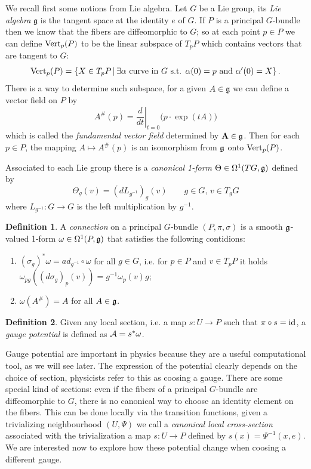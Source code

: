 \documentclass{article}
\theoremstyle{definition}
\newtheorem{defi}{Definition}
\theoremstyle{remark}
\begin{document}
We recall first some notions from Lie algebra. Let \(G\) be a Lie group, its \emph{Lie algebra} \(\mathfrak{g}\) is the tangent space at the identity \(e\) of \(G\). If \(P\) is a principal \(G\)-bundle then we know that the fibers are diffeomorphic to \(G\); so at each point \(p\in P\) we can define \(\operatorname{Vert}_p(P)\) to be the linear subspace of \(T_pP\) which contains vectors that are tangent to \(G\):
\[\operatorname{Vert}_p(P)=\left\{X\in T_pP\, |\, \exists\alpha \text{ curve in \(G\) s.t. } \alpha(0)=p \text{ and } \alpha'(0)=X\right\}.\]
There is a way to determine such subspace, for a given \(A\in\mathfrak{g}\) we can define a vector field on \(P\) by
\[A^\#(p) = \left.\frac{d}{dt}\right|_{t=0} \big( p \cdot \exp(tA) \big)\]
which is called the \emph{fundamental vector field} determined by \(\mathbf{A}\in \mathfrak{g}\). Then for each \(p\in P\), the mapping \(A\mapsto A^\#(p)\) is an isomorphism from \(\mathfrak{g}\) onto \(\operatorname{Vert}_p(P)\).

Associated to each Lie group there is a \emph{canonical 1-form} \(\Theta\in\Omega^1(TG,\mathfrak{g})\) defined by 
\[\Theta_g(v)=(dL_{g^{-1}})_g(v)\qquad g\in G,\, v\in T_gG\]
where \(L_{g^{-1}}\colon G\to G\) is the left multiplication by \(g^{-1}\).

\begin{defi}\label{def: connection on princial bundles}
    A \emph{connection} on a principal \(G\)-bundle \((P,\pi,\sigma)\) is a smooth \(\mathfrak{g}\)-valued 1-form \(\omega\in\Omega^1(P,\mathfrak{g})\) that satisfies the following contidions:
    \begin{enumerate}
        \item \((\sigma_g)^*\omega=ad_{g^{-1}}\circ \omega\) for all \(g\in G\), i.e. for \(p\in P\) and \(v\in T_pP\) it holds \(\omega_{pg}((d\sigma_g)_p(v))=g^{-1}\omega_p(v)g\);
        \item \(\omega(A^\#)=A\) for all \(A\in\mathfrak{g}\).
    \end{enumerate}
\end{defi}

\begin{defi}
    Given any local section, i.e. a map \(s\colon U\to P\) such that \(\pi\circ s=\mathrm{id}\),
    a \emph{gauge potential} is defined as \(\mathcal{A}=s^*\omega\).
\end{defi}

Gauge potential are important in physics because they are a useful computational tool, as we will see later. The expression of the potential clearly depends on the choice of section, physicists refer to this as coosing a gauge. There are some special kind of sections: even if the fibers of a principal \(G\)-bundle are diffeomorphic to \(G\), there is no canonical way to choose an identity element on the fibers. This can be done locally via the transition functions, given a trivializing neighbourhood \((U,\Psi)\) we call a \emph{canonical local cross-section} associated with the trivialization a map \(s\colon U\to P\) defined by \(s(x)=\Psi^{-1}(x,e)\). 
We are interested now to explore how these potential change when coosing a different gauge.
\end{document}
